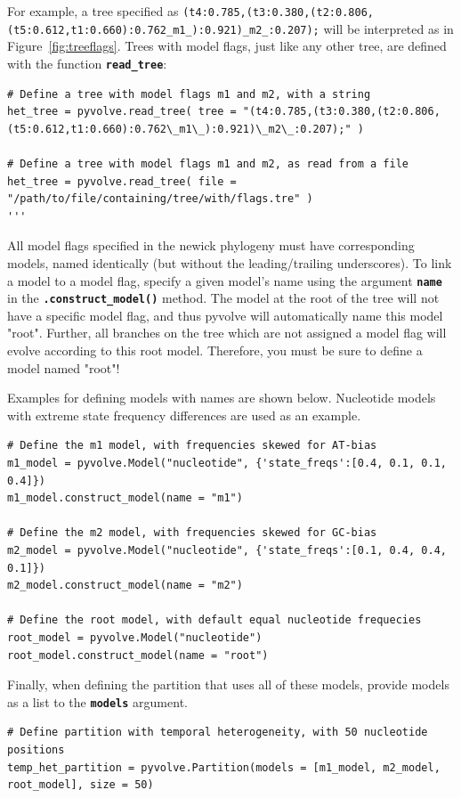 \documentclass{article}
\newcommand{\code}[1]{\textbf{\texttt{\small{#1}}}}
\begin{document}
For example, a tree specified as  \texttt{\scriptsize{(t4:0.785,(t3:0.380,(t2:0.806,(t5:0.612,t1:0.660):0.762\_m1\_):0.921)\_m2\_:0.207);}} will be interpreted as in Figure~\ref{fig:treeflags}. Trees with model flags, just like any other tree, are defined with the function \code{read\_tree}:
\begin{lstlisting}
# Define a tree with model flags m1 and m2, with a string
het_tree = pyvolve.read_tree( tree = "(t4:0.785,(t3:0.380,(t2:0.806,(t5:0.612,t1:0.660):0.762\_m1\_):0.921)\_m2\_:0.207);" )

# Define a tree with model flags m1 and m2, as read from a file
het_tree = pyvolve.read_tree( file = "/path/to/file/containing/tree/with/flags.tre" )
'''
\end{lstlisting}


All model flags specified in the newick phylogeny must have corresponding models, named identically (but without the leading/trailing underscores). To link a model to a model flag, specify a given model's name using the argument \code{name} in the \code{.construct\_model()} method. The model at the root of the tree will not have a specific model flag, and thus pyvolve will automatically name this model "root". Further, all branches on the tree which are not assigned a model flag will evolve according to this root model. Therefore, you must be sure to define a model named "root"!

Examples for defining models with names are shown below. Nucleotide models with extreme state frequency differences are used as an example.
\begin{lstlisting}
# Define the m1 model, with frequencies skewed for AT-bias
m1_model = pyvolve.Model("nucleotide", {'state_freqs':[0.4, 0.1, 0.1, 0.4]})
m1_model.construct_model(name = "m1")

# Define the m2 model, with frequencies skewed for GC-bias
m2_model = pyvolve.Model("nucleotide", {'state_freqs':[0.1, 0.4, 0.4, 0.1]})
m2_model.construct_model(name = "m2")

# Define the root model, with default equal nucleotide frequecies
root_model = pyvolve.Model("nucleotide")
root_model.construct_model(name = "root")
\end{lstlisting}


Finally, when defining the partition that uses all of these models, provide models as a list to the \code{models} argument.
\begin{lstlisting}
# Define partition with temporal heterogeneity, with 50 nucleotide positions
temp_het_partition = pyvolve.Partition(models = [m1_model, m2_model, root_model], size = 50) 
\end{lstlisting}
\end{document}
